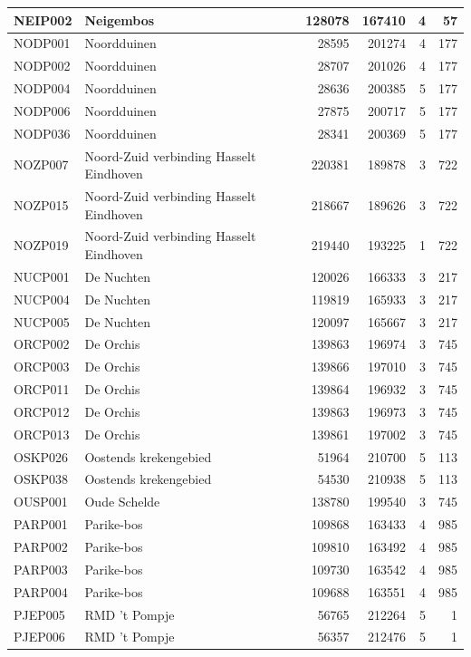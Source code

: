 \documentclass[11pt,]{book}
\begin{document}
\begin{table}
\begin{tabular}[t]{l|l|r|r|r|r}
NEIP002 & Neigembos & 128078 & 167410 & 4 & 57\\
\hline
NODP001 & Noordduinen & 28595 & 201274 & 4 & 177\\
\hline
NODP002 & Noordduinen & 28707 & 201026 & 4 & 177\\
\hline
NODP004 & Noordduinen & 28636 & 200385 & 5 & 177\\
\hline
NODP006 & Noordduinen & 27875 & 200717 & 5 & 177\\
\hline
NODP036 & Noordduinen & 28341 & 200369 & 5 & 177\\
\hline
NOZP007 & Noord-Zuid verbinding Hasselt Eindhoven & 220381 & 189878 & 3 & 722\\
\hline
NOZP015 & Noord-Zuid verbinding Hasselt Eindhoven & 218667 & 189626 & 3 & 722\\
\hline
NOZP019 & Noord-Zuid verbinding Hasselt Eindhoven & 219440 & 193225 & 1 & 722\\
\hline
NUCP001 & De Nuchten & 120026 & 166333 & 3 & 217\\
\hline
NUCP004 & De Nuchten & 119819 & 165933 & 3 & 217\\
\hline
NUCP005 & De Nuchten & 120097 & 165667 & 3 & 217\\
\hline
ORCP002 & De Orchis & 139863 & 196974 & 3 & 745\\
\hline
ORCP003 & De Orchis & 139866 & 197010 & 3 & 745\\
\hline
ORCP011 & De Orchis & 139864 & 196932 & 3 & 745\\
\hline
ORCP012 & De Orchis & 139863 & 196973 & 3 & 745\\
\hline
ORCP013 & De Orchis & 139861 & 197002 & 3 & 745\\
\hline
OSKP026 & Oostends krekengebied & 51964 & 210700 & 5 & 113\\
\hline
OSKP038 & Oostends krekengebied & 54530 & 210938 & 5 & 113\\
\hline
OUSP001 & Oude Schelde & 138780 & 199540 & 3 & 745\\
\hline
PARP001 & Parike-bos & 109868 & 163433 & 4 & 985\\
\hline
PARP002 & Parike-bos & 109810 & 163492 & 4 & 985\\
\hline
PARP003 & Parike-bos & 109730 & 163542 & 4 & 985\\
\hline
PARP004 & Parike-bos & 109688 & 163551 & 4 & 985\\
\hline
PJEP005 & RMD 't Pompje & 56765 & 212264 & 5 & 1\\
\hline
PJEP006 & RMD 't Pompje & 56357 & 212476 & 5 & 1\\

\end{tabular}
\end{table}
\end{document}
